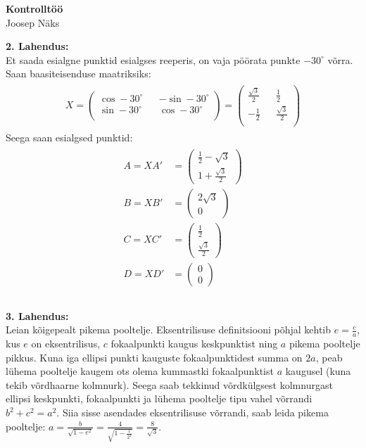 \documentclass{article}
\begin{document}
\begin{center}
\Large\textbf{Kontrolltöö}\\
\small{Joosep Näks}
\end{center}
\textbf{2. Lahendus:}\\
Et saada esialgne punktid esialgses reeperis, on vaja pöörata punkte $-30^\circ$ võrra. Saan baasiteisenduse maatriksiks: 
\begin{gather*}
\begin{aligned}
X=
\begin{pmatrix}
\cos -30^\circ && -\sin -30^\circ\\
\sin -30^\circ && \cos -30^\circ\\
\end{pmatrix}=
\begin{pmatrix}
\frac{\sqrt{3}}2 && \frac12\\
-\frac12 && \frac{\sqrt{3}}2\\
\end{pmatrix}
\end{aligned}
\end{gather*}
Seega saan esialgsed punktid:
\begin{gather*}
\begin{aligned}
A=XA'&=\begin{pmatrix}\frac12-\sqrt{3}\\1+\frac{\sqrt{3}}{2}\end{pmatrix}\\
B=XB'&=\begin{pmatrix}2\sqrt{3}\\0\end{pmatrix}\\
C=XC'&=\begin{pmatrix}\frac12\\\frac{\sqrt{3}}2\end{pmatrix}\\
D=XD'&=\begin{pmatrix}0\\0\end{pmatrix}\\
\end{aligned}
\end{gather*}
\pagebreak\\
\textbf{3. Lahendus:}\\
Leian kõigepealt pikema pooltelje. Eksentrilisuse definitsiooni põhjal kehtib $e=\frac{c}{a}$, kus $e$ on eksentrilisus, $c$ fokaalpunkti kaugus keskpunktist ning $a$ pikema pooltelje pikkus. Kuna iga ellipsi punkti kauguste fokaalpunktidest summa on $2a$, peab lühema pooltelje kaugem ots olema kummastki fokaalpunktist $a$ kaugusel (kuna tekib võrdhaarne kolmnurk). Seega saab tekkinud võrdkülgsest kolmnurgast ellipsi keskpunkti, fokaalpunkti ja lühema pooltelje tipu vahel võrrandi $b^2+c^2=a^2$. Siia sisse asendades eksentrilisuse võrrandi, saab leida pikema pooltelje: $a=\frac{b}{\sqrt{1-e^2}}=\frac4{\sqrt{1-\frac1{2^2}}}=\frac8{\sqrt3}$.\\
\end{document}
